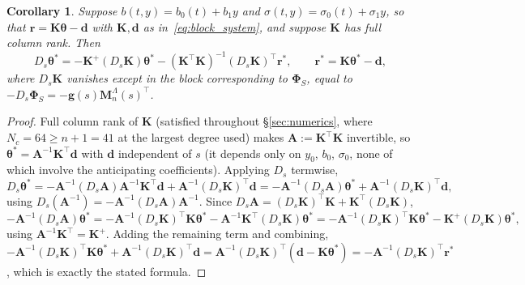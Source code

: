 \documentclass[11pt, a4paper]{article}
\theoremstyle{theoremstyle}
\newtheorem{corollary}[theorem]{Corollary}
\theoremstyle{definitionstyle}
\begin{document}
\begin{corollary}\label{cor:affine}
    Suppose $b(t,y)=b_0(t)+b_1y$ and $\sigma(t,y)=\sigma_0(t)+\sigma_1y$, so that $\mathbf r=\mathbf K\boldsymbol\theta-\mathbf d$ with $\mathbf K,\mathbf d$ as in~\eqref{eq:block_system}, and suppose $\mathbf K$ has full column rank. Then
    \begin{equation}\label{eq:Dtheta_affine}
        D_s\boldsymbol\theta^* = -\mathbf K^+(D_s\mathbf K)\boldsymbol\theta^*-(\mathbf K^\top\mathbf K)^{-1}(D_s\mathbf K)^\top\mathbf r^*,
        \qquad
        \mathbf r^*=\mathbf K\boldsymbol\theta^*-\mathbf d,
    \end{equation}
    where $D_s\mathbf K$ vanishes except in the block corresponding to $\boldsymbol\Phi_S$, equal to $-D_s\boldsymbol\Phi_S=-\mathbf g(s)\mathbf M_n^\Lambda(s)^\top$.
\end{corollary}
\begin{proof}
    Full column rank of $\mathbf K$ (satisfied throughout \S\ref{sec:numerics}, where $N_c=64 \ge n+1 = 41$ at the largest degree used) makes $\mathbf A := \mathbf K^\top\mathbf K$ invertible, so $\boldsymbol\theta^* = \mathbf A^{-1}\mathbf K^\top\mathbf d$ with $\mathbf d$ independent of $s$ (it depends only on $y_0$, $b_0$, $\sigma_0$, none of which involve the anticipating coefficients). Applying $D_s$ termwise,
    \begin{equation}
        D_s\boldsymbol\theta^* = -\mathbf A^{-1}(D_s\mathbf A)\mathbf A^{-1}\mathbf K^\top\mathbf d + \mathbf A^{-1}(D_s\mathbf K)^\top\mathbf d = -\mathbf A^{-1}(D_s\mathbf A)\boldsymbol\theta^* + \mathbf A^{-1}(D_s\mathbf K)^\top\mathbf d,
    \end{equation}
    using $D_s(\mathbf A^{-1}) = -\mathbf A^{-1}(D_s\mathbf A)\mathbf A^{-1}$. Since $D_s\mathbf A = (D_s\mathbf K)^\top\mathbf K + \mathbf K^\top(D_s\mathbf K)$,
    \begin{equation}
        -\mathbf A^{-1}(D_s\mathbf A)\boldsymbol\theta^* = -\mathbf A^{-1}(D_s\mathbf K)^\top\mathbf K\boldsymbol\theta^* - \mathbf A^{-1}\mathbf K^\top(D_s\mathbf K)\boldsymbol\theta^* = -\mathbf A^{-1}(D_s\mathbf K)^\top\mathbf K\boldsymbol\theta^* - \mathbf K^+(D_s\mathbf K)\boldsymbol\theta^*,
    \end{equation}
    using $\mathbf A^{-1}\mathbf K^\top = \mathbf K^+$. Adding the remaining term and combining, $-\mathbf A^{-1}(D_s\mathbf K)^\top\mathbf K\boldsymbol\theta^* + \mathbf A^{-1}(D_s\mathbf K)^\top\mathbf d = \mathbf A^{-1}(D_s\mathbf K)^\top(\mathbf d - \mathbf K\boldsymbol\theta^*) = -\mathbf A^{-1}(D_s\mathbf K)^\top\mathbf r^*$, which is exactly the stated formula.
\end{proof}
\end{document}
